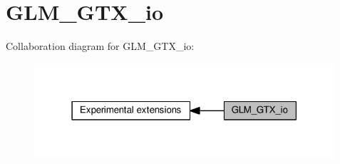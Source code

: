 \hypertarget{group__gtx__io}{}\section{G\+L\+M\+\_\+\+G\+T\+X\+\_\+io}
\label{group__gtx__io}
Collaboration diagram for G\+L\+M\+\_\+\+G\+T\+X\+\_\+io\+:
\nopagebreak
\begin{figure}[H]
\begin{center}
\leavevmode
\includegraphics[width=316pt]{dd/d4e/group__gtx__io}
\end{center}
\end{figure}
